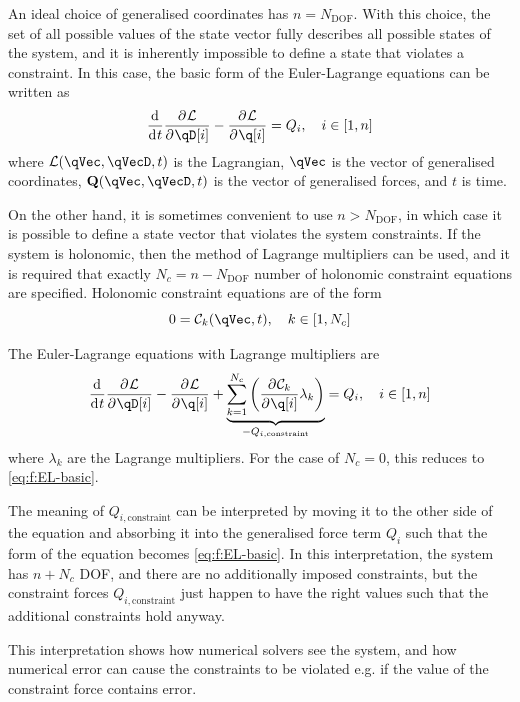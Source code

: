 \documentclass[11pt]{article}
\newcommand{\oD}[2]{
    \frac{\mathrm{d}\mspace{1mu}#1}{\mathrm{d}\mspace{1mu}#2}
}
\newcommand{\pD}[2]{
    \frac{\partial\mspace{1mu}#1}{\partial\mspace{1mu}#2}
}
\begin{document}
An ideal choice of generalised coordinates has $n=N_{\mathrm{DOF}}$. With this choice, the set of all possible values of the state vector fully describes all possible states of the system, and it is inherently impossible to define a state that violates a constraint. In this case, the basic form of the Euler-Lagrange equations can be written as
\begin{equation} \label{eq:f:EL-basic}
    \oD{}{t}\pD{\mathcal{L}}{\qD[i]} 
    - \pD{\mathcal{L}}{\q[i]}
    = Q_i
    ,\quad i\in[1,n]
\end{equation}
where $\mathcal{L}(\qVec, \qVecD, t)$ is the Lagrangian, $\qVec$ is the vector of generalised coordinates, $\mathbf{Q}(\qVec, \qVecD, t)$ is the vector of generalised forces, and $t$ is time.

On the other hand, it is sometimes convenient to use $n>N_{\mathrm{DOF}}$, in which case it is possible to define a state vector that violates the system constraints. If the system is holonomic, then the method of Lagrange multipliers can be used, and it is required that exactly $N_c = n - N_{\mathrm{DOF}}$ number of holonomic constraint equations are specified. Holonomic constraint equations are of the form
\begin{equation} \label{eq:f:C}
    0 = \mathcal{C}_k(\qVec, t), \quad k\in[1,N_c]
\end{equation}

The Euler-Lagrange equations with Lagrange multipliers are
\begin{equation} \label{eq:f:EL-multipliers}
    \oD{}{t}\pD{\mathcal{L}}{\qD[i]} 
    - \pD{\mathcal{L}}{\q[i]}
    + \underbrace{\sum_{k=1}^{N_c} \del{\pD{\mathcal{C}_k}{\q[i]} \lambda_k}}_{-Q_{i,\mathrm{constraint}}}
    = Q_i
    ,\quad i\in[1,n]
\end{equation}
where $\lambda_k$ are the Lagrange multipliers. For the case of $N_c=0$, this reduces to \eqref{eq:f:EL-basic}.

The meaning of $Q_{i,\mathrm{constraint}}$ can be interpreted by moving it to the other side of the equation and absorbing it into the generalised force term $Q_{i}$ such that the form of the equation becomes \eqref{eq:f:EL-basic}. In this interpretation, the system has $n+N_c$ DOF, and there are no additionally imposed constraints, but the constraint forces $Q_{i,\mathrm{constraint}}$ just happen to have the right values such that the additional constraints hold anyway.

This interpretation shows how numerical solvers see the system, and how numerical error can cause the constraints to be violated e.g. if the value of the constraint force contains error.
\end{document}
